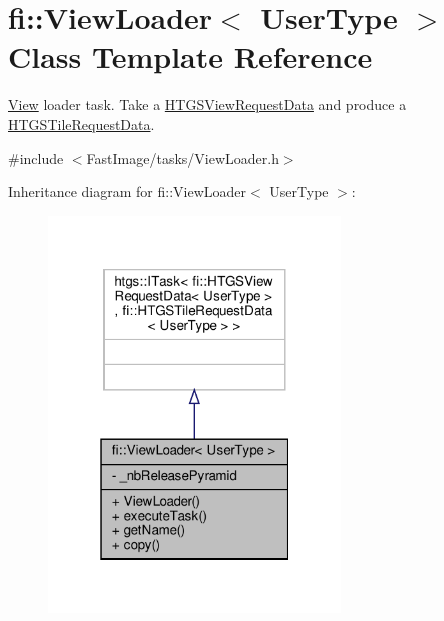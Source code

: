 \hypertarget{classfi_1_1ViewLoader}{}\section{fi\+:\+:View\+Loader$<$ User\+Type $>$ Class Template Reference}
\label{classfi_1_1ViewLoader}


\hyperlink{classfi_1_1View}{View} loader task. Take a \hyperlink{classfi_1_1HTGSViewRequestData}{H\+T\+G\+S\+View\+Request\+Data} and produce a \hyperlink{classfi_1_1HTGSTileRequestData}{H\+T\+G\+S\+Tile\+Request\+Data}.  




{\ttfamily \#include $<$Fast\+Image/tasks/\+View\+Loader.\+h$>$}



Inheritance diagram for fi\+:\+:View\+Loader$<$ User\+Type $>$\+:
\nopagebreak
\begin{figure}[H]
\begin{center}
\leavevmode
\includegraphics[width=220pt]{d3/d06/classfi_1_1ViewLoader__inherit__graph}
\end{center}
\end{figure}


